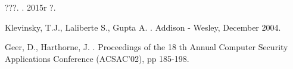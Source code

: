 \documentclass[pdflatex,11pt]{others/aghdpl}
\author{Jakub Syrek}
\date{2016}
\begin{document}









% 
% 



\begin{thebibliography}{1}

???.
.
\newblock 2015r ?.


Klevinsky, T.J., Laliberte S., Gupta A.
.
\newblock Addison - Wesley, December 2004.

Geer, D., Harthorne, J.
.
\newblock Proceedings of the 18 th Annual Computer Security Applications Conference (ACSAC'02), pp 185-198.




\end{thebibliography}
\end{document}
